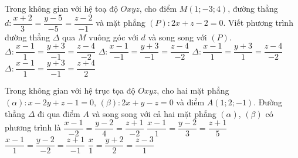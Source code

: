 \begin{ex}%
	Trong không gian với hệ toạ độ $Oxyz$, cho điểm $M(1;-3;4)$, đường thẳng $d\colon \dfrac{x+2}{3}=\dfrac{y-5}{-5}=\dfrac{z-2}{-1}$ và mặt phẳng $(P)\colon 2x+z-2=0$. Viết phương trình đường thẳng $\Delta$ qua $M$ vuông góc với $d$ và song song với $(P)$.
	\choice
	{$\Delta\colon\dfrac{x-1}{1}=\dfrac{y+3}{-1}=\dfrac{z-4}{-2}$}
	{$\Delta\colon\dfrac{x-1}{-1}=\dfrac{y+3}{-1}=\dfrac{z-4}{-2}$}
	{\True $\Delta\colon\dfrac{x-1}{1}=\dfrac{y+3}{1}=\dfrac{z-4}{-2}$}
	{$\Delta\colon\dfrac{x-1}{1}=\dfrac{y+3}{-1}=\dfrac{z+4}{2}$}
\end{ex}
\begin{ex}%
	Trong không gian với hệ trục tọa độ $Oxyz$, cho hai mặt phẳng $(\alpha) \colon x-2y+z-1=0$, $(\beta) \colon 2x+y-z=0$ và điểm $A(1;2;-1)$. Đường thẳng $\Delta $ đi qua điểm $A$ và song song với cả hai mặt phẳng $(\alpha)$, $(\beta)$ có phương trình là
	\choice
	{$\dfrac{x-1}{-2}=\dfrac{y-2}{4}=\dfrac{z+1}{-2}$}
	{\True $\dfrac{x-1}{1}=\dfrac{y-2}{3}=\dfrac{z+1}{5}$}
	{$\dfrac{x-1}{1}=\dfrac{y-2}{-2}=\dfrac{z+1}{-1}$}
	{$\dfrac{x}{1}=\dfrac{y+2}{2}=\dfrac{z-3}{1}$}
\end{ex}
